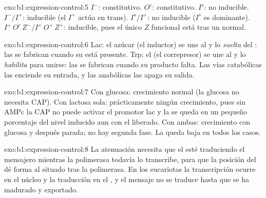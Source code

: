 \begin{solution}{exo:b1:expression-control:5}
$I^-$: constitutivo. $O^c$: constitutivo. $I^s$: no inducible.
$I^-/I^+$: inducible (el  $I^+$ actúa en trans). $I^s/I^+$: no
inducible ($I^s$ es dominante). $I^+\,O^c\,Z^- / I^+\,O^+\,Z^+$: inducible,
pues el único $Z$ funcional está tras un  normal.
\end{solution}

\begin{solution}{exo:b1:expression-control:6}
Lac: el azúcar (el inductor) se une al  y lo \emph{suelta} del
: las  se fabrican cuando su  está presente. Trp: el
 (el correpresor) se une al  y lo \emph{habilita} para
unirse: las  se fabrican cuando su producto falta. Las vías
catabólicas las enciende su entrada, y las anabólicas las apaga su salida.
\end{solution}

\begin{solution}{exo:b1:expression-control:7}
Con glucosa: crecimiento normal (la glucosa no necesita CAP). Con lactosa
sola: prácticamente ningún crecimiento, pues sin AMPc la CAP no puede
activar el promotor lac y la  se queda en un pequeño porcentaje del
nivel inducido aun con el  liberado. Con ambas: crecimiento con
glucosa y después parada; no hay segunda fase. La  queda baja en todos
los casos.
\end{solution}

\begin{solution}{exo:b1:expression-control:8}
La atenuación necesita que el  esté traduciendo el mensajero
mientras la polimerasa todavía lo transcribe, para que la posición del
 dé forma al  situado tras la polimerasa. En los eucariotas la
transcripción ocurre en el núcleo y la traducción en el , y el
mensaje no se traduce hasta que se ha madurado y exportado.
\end{solution}

